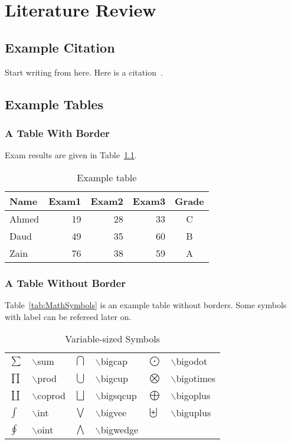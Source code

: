 \chapter{Literature Review}
\section{Example Citation}
Start writing from here. Here is a citation~\cite{Knuth92}.
\section{Example Tables}
\subsection{A Table With Border}
Exam results are given in Table~\ref{tab:Results}.
\begin{table}[htbp]
\caption{Example table}
\label{tab:Results}
\begin{center}
\begin{tabular}{| l || r | r | r | c |}
\hline
Name&Exam1&Exam2&Exam3&Grade\\
\hline\hline
Ahmed&19& 28&33&C \\
\hline
Daud&49& 35&60&B  \\
\hline
Zain&76& 38&59&A  \\
\hline
\end{tabular}
\end{center}
\end{table}

\subsection{A Table Without Border}
Table~\ref{tab:MathSymbols} is an example table without borders.  Some symbols with label can be refereed later on.
\begin{table}[htbp]
\caption{Variable-sized  Symbols}
\label{tab:MathSymbols}
\begin{center}
\begin{tabular}{l l l l l l}
$\sum$  \label{p1}&$\backslash$sum   &$\bigcap$ \label{p2}&$\backslash$bigcap      &$\bigodot$   &$\backslash$bigodot  \\
$\prod$ &$\backslash$prod  &$\bigcup$   &$\backslash$bigcup    &$\bigotimes$ &$\backslash$bigotimes\\
$\coprod$ &$\backslash$coprod &$\bigsqcup$ &$\backslash$bigsqcup  &$\bigoplus$ &$\backslash$bigoplus \\
$\int$     &$\backslash$int   &$\bigvee$   &$\backslash$bigvee    &$\biguplus$ &$\backslash$biguplus\\
$\oint$     &$\backslash$oint &$\bigwedge$ &$\backslash$bigwedge
\end{tabular}
\end{center}
\end{table}

